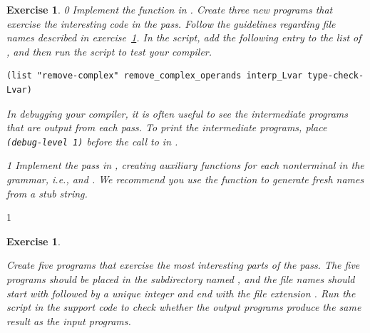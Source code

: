 \documentclass[7x10]{TimesAPriori_MIT}%
\def\racketEd{0}
\def\pythonEd{1}
\def\edition{0}
\newtheorem{exercise}[theorem]{Exercise}
\numberwithin{theorem}{chapter}
\numberwithin{definition}{chapter}
\numberwithin{equation}{chapter}
\begin{document}
\begin{exercise}
  \normalfont\normalsize
{\if\edition\racketEd  
Implement the  function in
.
%
Create three new \LangVar{} programs that exercise the interesting
code in the  pass.  Follow the guidelines
regarding file names described in exercise~\ref{ex:Lvar}.
%
In the  script, add the following entry to the
list of , and then run the script to test your compiler.
\begin{lstlisting}
(list "remove-complex" remove_complex_operands interp_Lvar type-check-Lvar)
\end{lstlisting}
In debugging your compiler, it is often useful to see the intermediate
programs that are output from each pass. To print the intermediate
programs, place \lstinline{(debug-level 1)} before the call to
 in .  \fi}
%
{\if\edition\pythonEd
  Implement the  pass in
  , creating auxiliary functions for each
  nonterminal in the grammar, i.e., 
  and . We recommend you use the function
   to generate fresh names from a stub string.
\fi}  
\end{exercise}

{\if\edition\pythonEd
\begin{exercise}
\normalfont\normalsize
\label{ex:Lvar}

Create five \LangVar{} programs that exercise the most interesting
parts of the  pass.  The five programs
should be placed in the subdirectory named , and the file
names should start with  followed by a unique
integer and end with the file extension .
Run the  script in the support code to check
whether the output programs produce the same result as the input
programs.
\end{exercise}

\fi}
\end{document}
